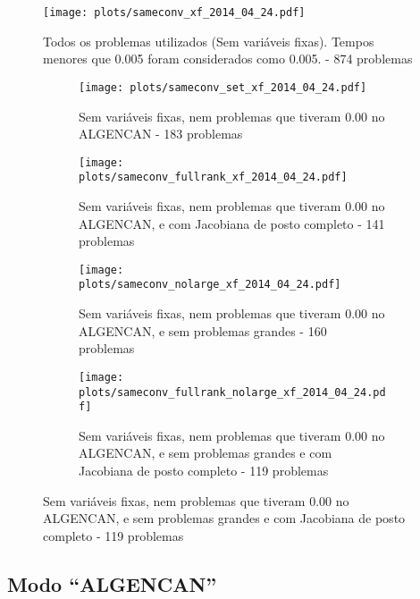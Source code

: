\documentclass{article}
\begin{document}
\begin{figure}[H]
  \centering
  \texttt{[image: plots/sameconv\_xf\_2014\_04\_24.pdf]}
  \caption{Todos os problemas utilizados (Sem variáveis fixas). Tempos menores
    que 0.005 foram considerados como 0.005. - 874 problemas}
\end{figure}
\begin{figure}[H]
  \centering
  \begin{subfigure}{0.48\textwidth}
    \texttt{[image: plots/sameconv\_set\_xf\_2014\_04\_24.pdf]}
    \caption{Sem variáveis fixas, nem problemas
      que tiveram 0.00 no ALGENCAN - 183 problemas}
  \end{subfigure}
  \begin{subfigure}{0.48\textwidth}
    \texttt{[image: plots/sameconv\_fullrank\_xf\_2014\_04\_24.pdf]}
    \caption{Sem variáveis fixas, nem problemas
      que tiveram 0.00 no ALGENCAN, e com Jacobiana de posto completo - 141
      problemas}
  \end{subfigure}
  \begin{subfigure}{0.48\textwidth}
    \texttt{[image: plots/sameconv\_nolarge\_xf\_2014\_04\_24.pdf]}
    \caption{Sem variáveis fixas, nem problemas
      que tiveram 0.00 no ALGENCAN, e sem problemas grandes - 160 problemas}
  \end{subfigure}
  \begin{subfigure}{0.48\textwidth}
    \texttt{[image: plots/sameconv\_fullrank\_nolarge\_xf\_2014\_04\_24.pdf]}
    \caption{Sem variáveis fixas, nem problemas
      que tiveram 0.00 no ALGENCAN, e sem problemas grandes e com Jacobiana de
      posto completo - 119 problemas}
  \end{subfigure}
\end{figure}

\subsection{Modo ``ALGENCAN''}
\end{document}
